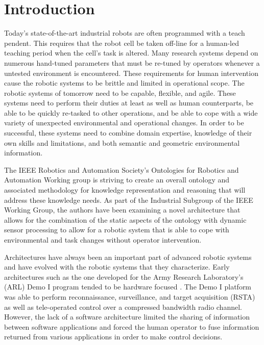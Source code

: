 \documentclass[preprint,12pt]{elsarticle}
\begin{document}

\section{Introduction}
\label{sect:introduction}
Today's state-of-the-art industrial robots are often programmed with a teach pendent. This requires that the robot cell be taken off-line for a 
human-led teaching period when the cell\rq{}s
task is altered.  Many research systems depend on numerous hand-tuned parameters that must be re-tuned by operators whenever a untested
environment is encountered. These requirements for human intervention cause the robotic systems
to be brittle and limited in operational scope. The robotic systems of tomorrow 
need to be capable, flexible, and agile.  These systems need to perform their duties at least as well as human counterparts, be able to be quickly re-tasked to other operations,
and be able to cope with a wide variety of unexpected environmental and operational changes. In order to be successful, these systems need to combine domain expertise, 
knowledge of their own skills and limitations, and both semantic and geometric environmental information. 

The IEEE Robotics and Automation Society\rq{}s Ontologies for Robotics and Automation Working group is striving to create an overall ontology and
associated methodology for knowledge representation and reasoning that will address these knowledge needs. As part of the
Industrial Subgroup of the IEEE Working Group, the authors have been examining a novel architecture that allows for the combination of the static
aspects of the ontology with dynamic sensor processing to allow for a robotic system that is able to cope with environmental and task changes
without operator intervention.

Architectures have always been an important part of advanced robotic systems and have evolved with the robotic systems that they characterize. 
Early architectures such as the one developed for the Army Research Laboratory\rq{}s (ARL) Demo I program tended to be hardware focused 
\cite{Balakirsky93}. The Demo I platform was able to perform reconnaissance, surveillance, and target acquisition (RSTA) as well as tele-operated
control over a compressed bandwidth
radio channel. However, the lack of a software architecture limited the sharing of information between software applications and forced the human
operator to fuse information returned from various applications in order to make control decisions.  
\end{document}
